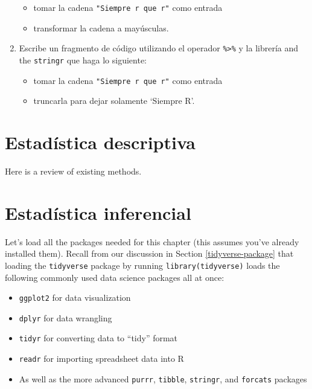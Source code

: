 \documentclass[
]{book}
\providecommand{\tightlist}{%
  \setlength{\itemsep}{0pt}\setlength{\parskip}{0pt}}
\begin{document}
\begin{enumerate}
  \begin{itemize}
  \tightlist
  \item
    tomar la cadena \texttt{"Siempre\ r\ que\ r"} como entrada
  \item
    transformar la cadena a mayúsculas.
  \end{itemize}
\item
  Escribe un fragmento de código utilizando el operador \texttt{\%\textgreater{}\%} y la librería and the \texttt{stringr} que haga lo siguiente:

  \begin{itemize}
  \tightlist
  \item
    tomar la cadena \texttt{"Siempre\ r\ que\ r"} como entrada
  \item
    truncarla para dejar solamente `Siempre R'.
  \end{itemize}
\end{enumerate}

\hypertarget{estaduxedstica-descriptiva}{%
\chapter{Estadística descriptiva}\label{estaduxedstica-descriptiva}}

Here is a review of existing methods.

\hypertarget{estaduxedstica-inferencial}{%
\chapter{Estadística inferencial}\label{estaduxedstica-inferencial}}

Let's load all the packages needed for this chapter (this assumes you've already installed them). Recall from our discussion in Section \ref{tidyverse-package} that loading the \texttt{tidyverse} package by running \texttt{library(tidyverse)} loads the following commonly used data science packages all at once:

\begin{itemize}
\tightlist
\item
  \texttt{ggplot2} for data visualization
\item
  \texttt{dplyr} for data wrangling
\item
  \texttt{tidyr} for converting data to ``tidy'' format
\item
  \texttt{readr} for importing spreadsheet data into R
\item
  As well as the more advanced \texttt{purrr}, \texttt{tibble}, \texttt{stringr}, and \texttt{forcats} packages
\end{itemize}
\end{document}
